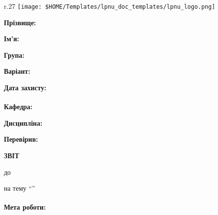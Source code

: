 \Margins
\begin{wrapfigure}[3]{r}{.27\textwidth}
\texttt{[image: \$HOME/Templates/lpnu\_doc\_templates/lpnu\_logo.png]}
\end{wrapfigure}

\noindent\textbf{Прізвище:} \Lname

\noindent\textbf{Ім'я:} \Fname

\noindent\textbf{Група:} \Group

\noindent\textbf{Варіант:} \Variant

\noindent\textbf{Дата захисту:} \Date
\\\\
\noindent\textbf{Кафедра:} \Department

\noindent\textbf{Дисципліна:} \Discipline

\noindent\textbf{Перевірив:} \Instructor


\begin{center}
	\textbf{ЗВІТ}

	до \Type~\No\Number

	на тему ``\Topic''
\end{center}
\paragraph{Мета роботи:}
